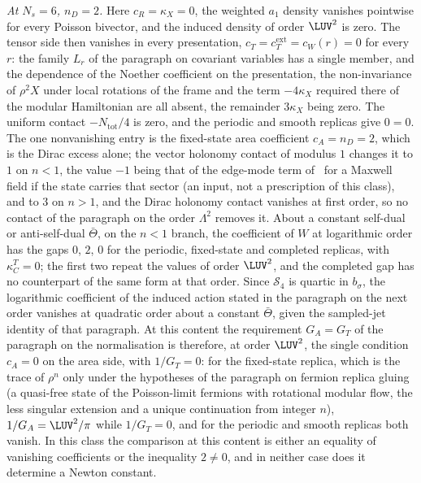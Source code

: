 \emph{At \(N_s=6\), \(n_D=2\).} Here \(c_R=\kappa_X=0\), the weighted \(a_1\) density vanishes pointwise for every Poisson bivector, and the induced density of order \(\LUV^2\) is zero. The tensor side then vanishes in every presentation, \(c_T=c_T^{\mathrm{ext}}=c_W(r)=0\) for every \(r\): the family \(L_r\) of the paragraph on covariant variables has a single member, and the dependence of the Noether coefficient on the presentation, the non-invariance of \(\rho^2X\) under local rotations of the frame and the term \(-4\kappa_X\) required there of the modular Hamiltonian are all absent, the remainder \(3\kappa_X\) being zero. The uniform contact \(-N_{\mathrm{tot}}/4\) is zero, and the periodic and smooth replicas give \(0=0\). The one nonvanishing entry is the fixed-state area coefficient \(c_A=n_D=2\), which is the Dirac excess alone; the vector holonomy contact of modulus \(1\) changes it to \(1\) on \(n<1\), the value \(-1\) being that of the edge-mode term of~\cite{DonnellyWall2016} for a Maxwell field if the state carries that sector (an input, not a prescription of this class), and to \(3\) on \(n>1\), and the Dirac holonomy contact vanishes at first order, so no contact of the paragraph on the order \(\Lambda^2\) removes it. About a constant self-dual or anti-self-dual \(\bar\Theta\), on the \(n<1\) branch, the coefficient of \(W\) at logarithmic order has the gaps \(0\), \(2\), \(0\) for the periodic, fixed-state and completed replicas, with \(\kappa_C^T=0\); the first two repeat the values of order \(\LUV^2\), and the completed gap has no counterpart of the same form at that order. Since \(\mathcal S_4\) is quartic in \(b_\sigma\), the logarithmic coefficient of the induced action stated in the paragraph on the next order vanishes at quadratic order about a constant \(\bar\Theta\), given the sampled-jet identity of that paragraph. At this content the requirement \(G_A=G_T\) of the paragraph on the normalisation is therefore, at order \(\LUV^2\), the single condition \(c_A=0\) on the area side, with \(1/G_T=0\): for the fixed-state replica, which is the trace of \(\rho^n\) only under the hypotheses of the paragraph on fermion replica gluing (a quasi-free state of the Poisson-limit fermions with rotational modular flow, the less singular extension and a unique continuation from integer \(n\)), \(1/G_A=\LUV^2/\pi\) while \(1/G_T=0\), and for the periodic and smooth replicas both vanish. In this class the comparison at this content is either an equality of vanishing coefficients or the inequality \(2\neq0\), and in neither case does it determine a Newton constant.

